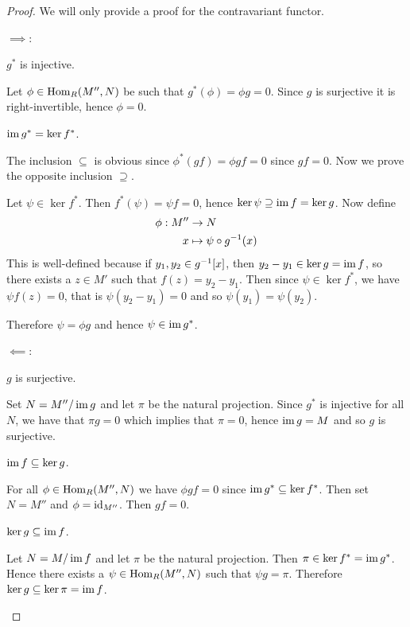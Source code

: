 \begin{proof}
	We will only provide a proof for the contravariant functor. \par
	$\implies$:
	\begin{enum}
		\io
		$g^*$ is injective.\par
		Let $\phi \in \operatorname{Hom}_R(M'',N)$ be such that $g^*(\phi) = \phi g = 0$.
		Since $g$ is surjective it is right-invertible, hence $\phi=0$.
		
		\io
		$\operatorname{im} g^* = \ker f^*$.\par
		The inclusion $\subseteq$ is obvious since $\phi^*(gf) = \phi gf = 0$ since $gf=0$.
		Now we prove the opposite inclusion $\supseteq$.
		
		Let $\psi \in \ker f^*$.
		Then $f^*(\psi) = \psi f = 0$, hence $\ker \psi \supseteq \operatorname{im} f = \ker g$.
		Now define
		\begin{align*}
			\phi: M'' &\to N \\
			x &\mapsto \psi \circ g^{-1}(x)
		\end{align*}
		This is well-defined because if $y_1,y_2 \in g^{-1}[x]$, then $y_2-y_1 \in \ker g = \operatorname{im} f$, so there exists a $z \in M'$ such that $f(z) = y_2-y_1$.
		Then since $\psi \in \ker f^*$, we have $\psi f(z) = 0$, that is $\psi(y_2-y_1) = 0$ and so $\psi(y_1)=\psi(y_2)$.
		
		Therefore $\psi = \phi g$ and hence $\psi \in \operatorname{im} g^*$.
	\end{enum}
	
	$\impliedby$:
	\begin{enum}
		\io $g$ is surjective.\par
		Set $N = M''/\operatorname{im} g$ and let $\pi$ be the natural projection.
		Since $g^*$ is injective for all $N$, we have that $\pi g = 0$ which implies that $\pi=0$, hence $\operatorname{im} g = M$ and so $g$ is surjective.

		\io $\operatorname{im} f \subseteq \ker g$.\par
		For all $\phi \in \operatorname{Hom}_R(M'',N)$ we have $\phi gf=0$ since $\operatorname{im} g^* \subseteq \ker f^*$.
		Then set $N = M''$ and $\phi = \operatorname{id}_{M''}$.
		Then $gf=0$.
		
		\io
		$\ker g \subseteq \operatorname{im} f$.\par
		Let $N = M/\operatorname{im} f$ and let $\pi$ be the natural projection.
		Then $\pi \in \ker f^* = \operatorname{im} g^*$.
		Hence there exists a $\psi \in \operatorname{Hom}_R(M'',N)$ such that $\psi g = \pi$.
		Therefore $\ker g \subseteq \ker \pi = \operatorname{im} f$. \qedhere
	\end{enum}
\end{proof}

